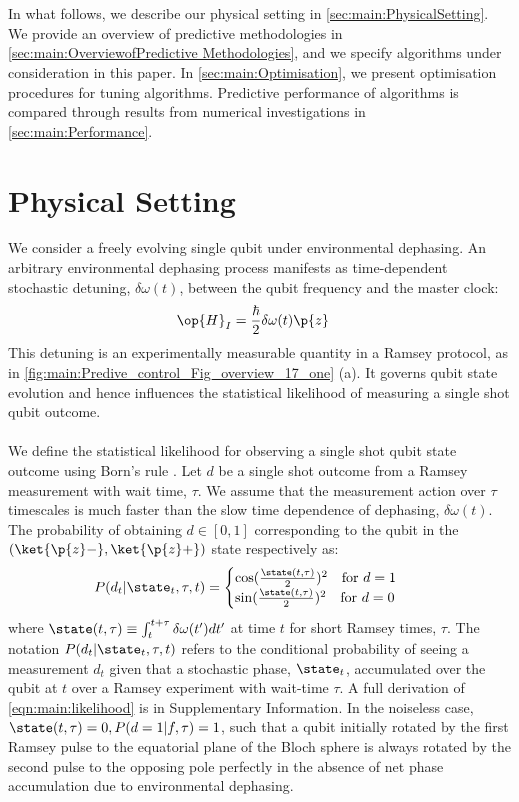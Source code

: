 \\
\\
In what follows, we describe our physical setting in \cref{sec:main:PhysicalSetting}. We provide an overview of predictive methodologies in  \cref{sec:main:OverviewofPredictive Methodologies}, and we specify algorithms under consideration in this paper. In \cref{sec:main:Optimisation}, we present optimisation procedures for tuning algorithms. Predictive performance of algorithms is compared through results from numerical investigations in \cref{sec:main:Performance}. 


\section{Physical Setting \label{sec:main:PhysicalSetting}}  
\label{sec:main:1}
We consider a freely evolving single qubit under environmental dephasing. An arbitrary environmental dephasing process manifests as time-dependent stochastic detuning, $\delta \omega (t)$, between the qubit frequency and the master clock:
\begin{align}
\op{H}_I & = \frac{\hbar}{2}\delta \omega (t) \p{z}
\end{align}
This detuning is an experimentally measurable quantity in a Ramsey protocol, as in \cref{fig:main:Predive_control_Fig_overview_17_one} (a). It governs qubit state evolution and hence influences the statistical likelihood of measuring a single shot qubit outcome.  
\\
\\
We define the statistical likelihood for observing a single shot qubit state outcome  using Born's rule \cite{ferrie2013}. Let $d$ be a single shot outcome from a Ramsey measurement with wait time, $\tau$. We assume that the measurement action over $\tau$ timescales is much faster than the slow time dependence of dephasing,  $\delta \omega(t)$. The probability of obtaining $d \in [0,1]$ corresponding to the qubit in the $(\ket{\p{z}-}, \ket{\p{z}+})$ state respectively as:
\begin{align}
P(d_t | \state_t, \tau, t) &= \begin{cases} \cos(\frac{\state(t,\tau)}{2})^2 \quad \text{for $d=1$} \\   \sin(\frac{\state(t,\tau)}{2})^2  \quad \text{for $ d=0$} \end{cases} \label{eqn:main:likelihood}
\end{align}
where  $ \state(t,\tau) \equiv \int_{t}^{t+\tau} \delta \omega(t') dt'$ at time $t$ for short Ramsey times, $\tau$. The notation $P(d_t | \state_t, \tau, t)$ refers to the conditional probability of seeing a measurement $d_t$ given that a stochastic phase, $\state_t$, accumulated over the qubit at $t$ over a Ramsey experiment with wait-time $\tau$. A full derivation of \cref{eqn:main:likelihood} is in Supplementary Information. In the noiseless case, $\state(t, \tau) = 0, P(d=1| f, \tau) = 1$, such that a qubit initially rotated by the first Ramsey pulse to the equatorial plane of the Bloch sphere is always rotated by the second pulse to the opposing pole perfectly in the absence of net phase accumulation due to environmental dephasing.
